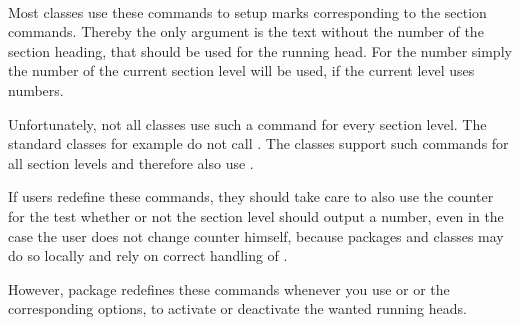 \begin{Declaration}
  \\
  \\
  \\
  \\
  \\
  \\
\end{Declaration}
%
%
%
%
%
%
%
Most classes use these commands to setup marks corresponding to the
section commands. Thereby the only argument is the text without the number of
the section heading, that should be used for the running head. For the number
simply the number of the current section level will be used, if the current
level uses numbers.

Unfortunately, not all classes use such a command for
every section level. The standard classes for example do not call
. The \KOMAScript{} classes support such commands for all
section levels and therefore also use .

If users redefine these commands, they should take care
to also use the counter  for the test whether or not the
section level should output a number, even in the case the user
does not change counter  himself, because packages and
classes may do so locally and rely on correct handling of
.

However, package  redefines these commands whenever you use
 or  or the corresponding options, to
activate or deactivate the wanted running heads.%
%
%
%
%
%
%
%
%

